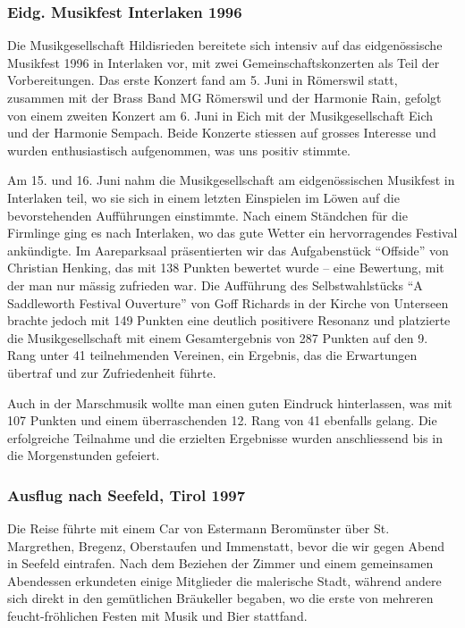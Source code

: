 \begin{history}

    \subsubsection*{Eidg. Musikfest Interlaken 1996}

    Die Musikgesellschaft Hildisrieden bereitete sich intensiv auf das
    eidgenössische Musikfest 1996 in Interlaken vor, mit zwei
    Gemeinschaftskonzerten als Teil der Vorbereitungen. Das erste Konzert fand
    am 5. Juni in Römerswil statt, zusammen mit der Brass Band MG Römerswil und
    der Harmonie Rain, gefolgt von einem zweiten Konzert am 6. Juni in Eich mit
    der Musikgesellschaft Eich und der Harmonie Sempach. Beide Konzerte stiessen
    auf grosses Interesse und wurden enthusiastisch aufgenommen, was uns positiv
    stimmte.

    Am 15. und 16. Juni nahm die Musikgesellschaft am eidgenössischen Musikfest
    in Interlaken teil, wo sie sich in einem letzten Einspielen im Löwen auf die
    bevorstehenden Aufführungen einstimmte. Nach einem Ständchen für die
    Firmlinge ging es nach Interlaken, wo das gute Wetter ein hervorragendes
    Festival ankündigte. Im Aareparksaal präsentierten wir das Aufgabenstück
    \enquote{Offside} von Christian Henking, das mit 138 Punkten bewertet wurde
    -- eine Bewertung, mit der man nur mässig zufrieden war. Die Aufführung des
    Selbstwahlstücks \enquote{A Saddleworth Festival Ouverture} von Goff
    Richards in der Kirche von Unterseen brachte jedoch mit 149 Punkten eine
    deutlich positivere Resonanz und platzierte die Musikgesellschaft mit einem
    Gesamtergebnis von 287 Punkten auf den 9. Rang unter 41 teilnehmenden
    Vereinen, ein Ergebnis, das die Erwartungen übertraf und zur Zufriedenheit
    führte.

    Auch in der Marschmusik wollte man einen guten Eindruck hinterlassen, was
    mit 107 Punkten und einem überraschenden 12. Rang von 41 ebenfalls gelang.
    Die erfolgreiche Teilnahme und die erzielten Ergebnisse wurden anschliessend
    bis in die Morgenstunden gefeiert.

    \subsubsection*{Ausflug nach Seefeld, Tirol 1997}

    Die Reise führte mit einem Car von Estermann Beromünster über St.
    Margrethen, Bregenz, Oberstaufen und Immenstatt, bevor die wir gegen Abend
    in Seefeld eintrafen. Nach dem Beziehen der Zimmer und einem gemeinsamen
    Abendessen erkundeten einige Mitglieder die malerische Stadt, während andere
    sich direkt in den gemütlichen Bräukeller begaben, wo die erste von mehreren
    feucht-fröhlichen Festen mit Musik und Bier stattfand.


\end{history}
